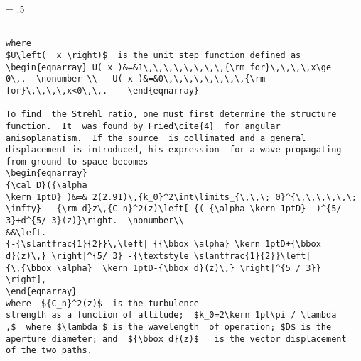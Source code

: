 \newpage
\baselineskip = .5\baselineskip  %
\begin{verbatim}

where
$U\left(  x \right)$  is the unit step function defined as
\begin{eqnarray} U( x )&=&1\,\,\,\,\,\,\,\,{\rm for}\,\,\,\,x\ge
0\,,  \nonumber \\   U( x )&=&0\,\,\,\,\,\,\,\,{\rm
for}\,\,\,\,x<0\,\,.    \end{eqnarray}

To find  the Strehl ratio, one must first determine the structure
function.  It  was found by Fried\cite{4}  for angular
anisoplanatism.  If the source  is collimated and a general
displacement is introduced, his expression  for a wave propagating
from ground to space becomes
\begin{eqnarray}
{\cal D}({\alpha
\kern 1ptD} )&=& 2(2.91)\,{k_0}^2\int\limits_{\,\,\; 0}^{\,\,\,\,\,\;
\infty}   {\rm d}z\,{C_n}^2(z)\left[ {( {\alpha \kern 1ptD}  )^{5/
3}+d^{5/ 3}(z)}\right.  \nonumber\\
&&\left.
{-{\slantfrac{1}{2}}\,\left| {{\bbox \alpha} \kern 1ptD+{\bbox
d}(z)\,} \right|^{5/ 3} -{\textstyle \slantfrac{1}{2}}\left|
{\,{\bbox \alpha}  \kern 1ptD-{\bbox d}(z)\,} \right|^{5 / 3}}
\right],
\end{eqnarray}
where  ${C_n}^2(z)$  is the turbulence
strength as a function of altitude;  $k_0=2\kern 1pt\pi / \lambda
,$  where $\lambda $ is the wavelength  of operation; $D$ is the
aperture diameter; and  ${\bbox d}(z)$   is the vector displacement
of the two paths.


\end{verbatim}
